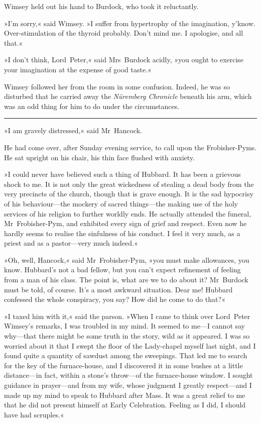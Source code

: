 Wimsey held out his hand to Burdock, who took it reluctantly.

»I'm sorry,« said Wimsey. »I suffer from hypertrophy of the imagination, y'know. Over-stimulation of the thyroid probably. Don't mind me. I apologise, and all that.«

»I don't think, Lord~Peter,« said Mrs~Burdock acidly, »you ought to exercise your imagination at the expense of good taste.«

Wimsey followed her from the room in some confusion. Indeed, he was so disturbed that he carried away the \textit{Nüremberg Chronicle} beneath his arm, which was an odd thing for him to do under the circumstances.

\noindent\hfil\rule{0.5\textwidth}{.4pt}\hfil 

»I am gravely distressed,« said Mr~Hancock.

He had come over, after Sunday evening service, to call upon the Frobisher-Pyms. He sat upright on his chair, his thin face flushed with anxiety.

»I could never have believed such a thing of Hubbard. It has been a grievous shock to me. It is not only the great wickedness of stealing a dead body from the very precincts of the church, though that is grave enough. It is the sad hypocrisy of his behaviour—the mockery of sacred things—the making use of the holy services of his religion to further worldly ends. He actually attended the funeral, Mr~Frobisher-Pym, and exhibited every sign of grief and respect. Even now he hardly seems to realise the sinfulness of his conduct. I feel it very much, as a priest and as a pastor—very much indeed.«

»Oh, well, Hancock,« said Mr~Frobisher-Pym, »you must make allowances, you know. Hubbard's not a bad fellow, but you can't expect refinement of feeling from a man of his class. The point is, what are we to do about it? Mr~Burdock must be told, of course. It's a most awkward situation. Dear me! Hubbard confessed the whole conspiracy, you say? How did he come to do that?«

»I taxed him with it,« said the parson. »When I came to think over Lord~Peter Wimsey's remarks, I was troubled in my mind. It seemed to me—I cannot say why—that there might be some truth in the story, wild as it appeared. I was so worried about it that I swept the floor of the Lady-chapel myself last night, and I found quite a quantity of sawdust among the sweepings. That led me to search for the key of the furnace-house, and I discovered it in some bushes at a little distance—in fact, within a stone's throw—of the furnace-house window. I sought guidance in prayer—and from my wife, whose judgment I greatly respect—and I made up my mind to speak to Hubbard after Mass. It was a great relief to me that he did not present himself at Early Celebration. Feeling as I did, I should have had scruples.«

